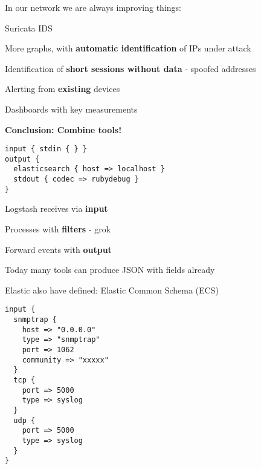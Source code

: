 \documentclass[Screen16to9,17pt]{foils}
\begin{document}







In our network we are always improving things:
\begin{list1}
\item Suricata IDS 
\item More graphs, with {\bf automatic identification} of IPs under attack
\item Identification of {\bf short sessions without data} - spoofed addresses
\item Alerting from {\bf existing} devices
\item Dashboards with key measurements
\end{list1}

\vskip 2cm
\centerline{\bf\Large Conclusion: Combine tools!}



\begin{verbatim}
input { stdin { } }
output {
  elasticsearch { host => localhost }
  stdout { codec => rubydebug }
}
\end{verbatim}

\begin{list2}
\item Logstash receives via {\bf input}
\item Processes with {\bf filters} - grok
\item Forward events with {\bf output}
\item Today many tools can produce JSON with fields already
\item Elastic also have defined: Elastic Common Schema (ECS)\\
\end{list2}



{\footnotesize
\begin{verbatim}
input {
  snmptrap {
    host => "0.0.0.0"
    type => "snmptrap"
    port => 1062
    community => "xxxxx"
  }
  tcp {
    port => 5000
    type => syslog
  }
  udp {
    port => 5000
    type => syslog
  }
}
\end{verbatim}
}
\end{document}
